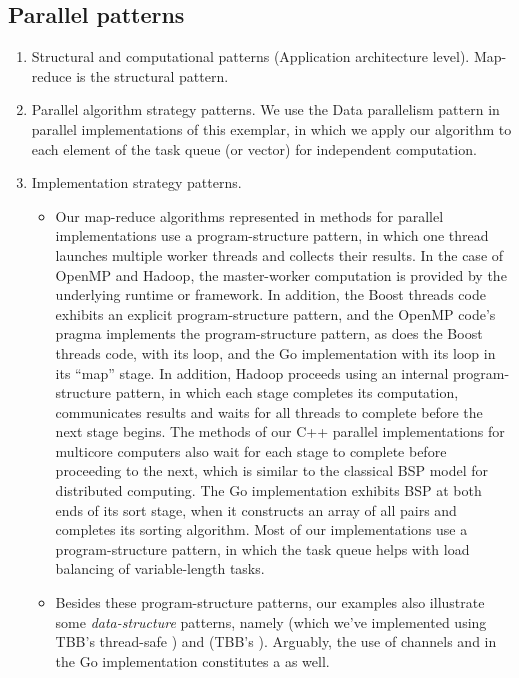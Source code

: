 \documentclass[letterpaper,10pt,openany,oneside]{sphinxmanual}
\begin{document}
\subsection{Parallel patterns}
\label{lookingahead/lookingahead:parallel-patterns}\begin{enumerate}
\item {} 
Structural and computational patterns (Application architecture level). Map-reduce is the structural pattern.

\item {} 
Parallel algorithm strategy patterns. We use the Data parallelism pattern in parallel implementations of this exemplar, in which we apply our  algorithm to each element of the task queue (or vector) for independent computation.

\item {} 
Implementation strategy patterns.
\begin{itemize}
\item {} 
Our map-reduce algorithms represented in  methods for parallel implementations use a  program-structure pattern, in which one thread launches multiple worker threads and collects their results. In the case of OpenMP and Hadoop, the master-worker computation is provided by the underlying runtime or framework. In addition, the Boost threads code exhibits an explicit  program-structure pattern, and the OpenMP code’s  pragma implements the  program-structure pattern, as does the Boost threads code, with its  loop, and the Go implementation with its  loop in its “map” stage. In addition, Hadoop proceeds using an internal  program-structure pattern, in which each stage completes its computation, communicates results and waits for all threads to complete before the next stage begins. The  methods of our C++ parallel implementations for multicore computers also wait for each stage to complete before proceeding to the next, which is similar to the classical BSP model for distributed computing. The Go implementation exhibits BSP at both ends of its sort stage, when it constructs an array of all pairs and completes its sorting algorithm. Most of our implementations use a  program-structure pattern, in which the task queue helps with load balancing of variable-length tasks.

\item {} 
Besides these program-structure patterns, our examples also illustrate some \emph{data-structure} patterns, namely  (which we’ve implemented using TBB’s thread-safe ) and  (TBB’s ). Arguably, the use of channels  and  in the Go implementation constitutes a  as well.


\end{itemize}
\end{enumerate}
\end{document}
